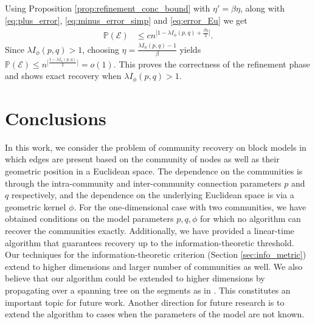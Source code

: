 \documentclass[letterpaper,11pt]{article}
\theoremstyle{definition}
\def\P{\mathbb{P}}
\def\cE{\mathcal{E}}
\numberwithin{equation}{section}
\newcommand{\la}{\lambda}
\theoremstyle{definition}
\def\P{\mathbb{P}}
\def\cE{\mathcal{E}}
\numberwithin{equation}{section}
\newcommand{\la}{\lambda}
\theoremstyle{thmstyletwo}%
\begin{document}
Using Proposition \ref{prop:refinement_conc_bound} with $\eta'=\beta \eta $, along with \eqref{eq:plus_error}, \eqref{eq:minus_error_simp} and \eqref{eq:error_Eu} we get
\begin{align}
\P(\cE) 
&\le c n^{\big[1- \la I_{\phi}(p,q)+\frac{\beta \eta}{2} \big]}.
\end{align}
Since $\la I_{\phi}(p,q) >1$, choosing $\eta = \frac{\la I_{\phi}(p,q) -1}{\beta}$ yields $\P(\cE) \le n^{\big[\frac{1- \la I_{\phi}(p,q)}{2} \big]}=o(1) $. 
This proves the correctness of the refinement phase and shows exact recovery when $\la I_{\phi}(p,q) >1$.


\section{Conclusions}
\label{sec:conclusions}
In this work, we consider the problem of community recovery on block models in which edges are present based on the community of nodes as well as their geometric position in a Euclidean space. The dependence on the communities is through the intra-community and inter-community connection parameters $p$ and $q$ respectively, and the dependence on the underlying Euclidean space is via a geometric kernel $\phi$. For the one-dimensional case with two communities, we have obtained conditions on the model parameters $p,q,\phi$ for which no algorithm can recover the communities exactly. Additionally, we have provided a linear-time algorithm that guarantees recovery up to the information-theoretic threshold. Our techniques for the information-theoretic criterion (Section \ref{sec:info_metric}) extend to higher dimensions and larger number of communities as well. We also believe that our algorithm could be extended to higher dimensions by propagating over a spanning tree on the segments as in \cite{gaudio2024exact}. This constitutes an important topic for future work.  Another direction for future research is to extend the algorithm to cases when the parameters of the model are not known.

%
%
\end{document}
